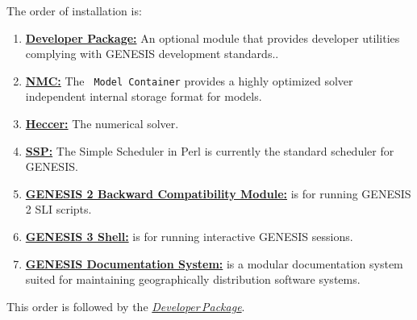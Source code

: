 \documentclass[12pt]{article}
\begin{document}
The order of installation is:
\begin{enumerate}
\item \href{../developer-package/developer-package.tex}{\bf Developer
    Package:} An optional module that provides developer utilities
  complying with GENESIS development standards..
\item \href{../model-container/model-container.tex}{\bf NMC:} The {\tt
    Model Container} provides a highly optimized solver independent
  internal storage format for models.
\item \href{../heccer/heccer.tex}{\bf Heccer:} The numerical solver.
\item \href{../ssp/ssp.tex}{\bf SSP:} The Simple Scheduler in Perl is
  currently the standard scheduler for GENESIS.
\item \href{../backward-compatibility/backward-compatibility.tex}{\bf
    GENESIS 2 Backward Compatibility Module:} is for running GENESIS 2
  SLI scripts.
\item \href{../gshell/gshell.tex}{\bf GENESIS 3 Shell:} is for running
  interactive GENESIS sessions.
\item \href{../documentation-overview/documentation-overview.tex}{\bf
    GENESIS Documentation System:} is a modular documentation system
  suited for maintaining geographically distribution software systems.
\end{enumerate} 

This order is followed by the \href{../developer_package/developer_package.tex}{\it Developer\,Package}.



\end{document}
